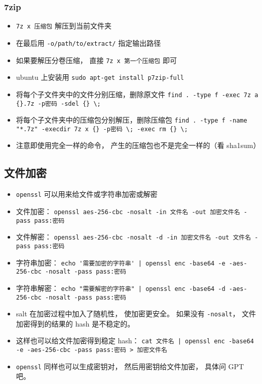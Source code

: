 \subsubsection{7zip}
\begin{itemize}
\item \verb|7z x 压缩包| 解压到当前文件夹
\item 在最后用 \verb`-o/path/to/extract/` 指定输出路径
\item 如果要解压分卷压缩， 直接 \verb`7z x 第一个压缩包` 即可
\item ubuntu 上安装用 \verb`sudo apt-get install p7zip-full`

\item 将每个子文件夹中的文件分别压缩，删除原文件
\verb`find . -type f -exec 7z a {}.7z -p密码 -sdel {} \;`
\item 将每个子文件夹中的压缩包分别解压，删除压缩包
\verb`find . -type f -name "*.7z" -execdir 7z x {} -p密码 \; -exec rm {} \;`
\item 注意即使用完全一样的命令， 产生的压缩包也不是完全一样的（看 sha1sum）
\end{itemize}

\subsection{文件加密}
\begin{itemize}
\item \verb|openssl| 可以用来给文件或字符串加密或解密
\item 文件加密： \verb`openssl aes-256-cbc -nosalt -in 文件名 -out 加密文件名 -pass pass:密码`
\item 文件解密： \verb`openssl aes-256-cbc -nosalt -d -in 加密文件名 -out 文件名 -pass pass:密码`
\item 字符串加密： \verb`echo '需要加密的字符串' | openssl enc -base64 -e -aes-256-cbc -nosalt -pass pass:密码`
\item 字符串解密： \verb`echo "需要解密的字符串" | openssl enc -base64 -d -aes-256-cbc -nosalt -pass pass:密码`
\item salt 在加密过程中加入了随机性， 使加密更安全。 如果没有 \verb|-nosalt|， 文件加密得到的结果的 hash 是不稳定的。
\item 这样也可以给文件加密得到稳定 hash： \verb`cat 文件名 | openssl enc -base64 -e -aes-256-cbc -pass pass:密码 > 加密文件名`
\item \verb|openssl| 同样也可以生成密钥对， 然后用密钥给文件加密， 具体问 GPT 吧。
\end{itemize}

